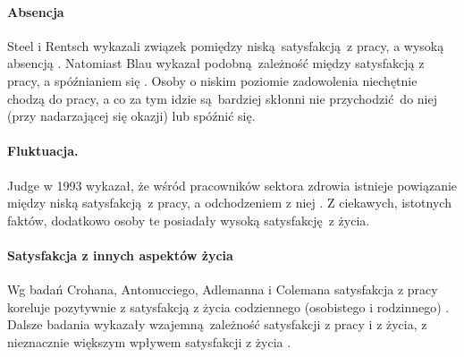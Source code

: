 \paragraph{Absencja} Steel i Rentsch wykazali związek pomiędzy niską satysfakcją z pracy, a wysoką absencją \cite{steel1995influence}. Natomiast Blau wykazał podobną zależność między satysfakcją z pracy, a spóźnianiem się \cite{blau1994developing}. Osoby o niskim poziomie zadowolenia niechętnie chodzą do pracy, a co za tym idzie są bardziej skłonni nie przychodzić do niej (przy nadarzającej się okazji) lub spóźnić się.  \paragraph{Fluktuacja.} Judge w 1993
wykazał, że wśród pracowników sektora zdrowia istnieje powiązanie między niską satysfakcją z pracy, a odchodzeniem z niej \cite{judge1993does}. Z ciekawych, istotnych faktów, dodatkowo osoby te posiadały wysoką satysfakcję z życia.
\paragraph{Satysfakcja z innych aspektów życia} Wg badań Crohana, Antonucciego, Adlemanna i Colemana satysfakcja z pracy koreluje pozytywnie z satysfakcją z życia codziennego (osobistego i rodzinnego) \cite{crohan1989job}. Dalsze badania wykazały wzajemną zależność satysfakcji z pracy i z życia, z nieznacznie większym wpływem satysfakcji z życia \cite{judge1993another}. 
